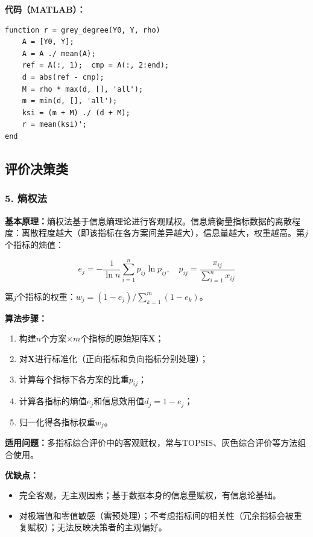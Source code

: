 \documentclass[12pt,a4paper]{ctexart}
\begin{document}
\textbf{代码（MATLAB）：}
\begin{lstlisting}
function r = grey_degree(Y0, Y, rho)
    A = [Y0, Y];
    A = A ./ mean(A);
    ref = A(:, 1);  cmp = A(:, 2:end);
    d = abs(ref - cmp);
    M = rho * max(d, [], 'all');
    m = min(d, [], 'all');
    ksi = (m + M) ./ (d + M);
    r = mean(ksi)';
end
\end{lstlisting}

\subsection{评价决策类}

\subsubsection{5. 熵权法}

\textbf{基本原理：}熵权法基于信息熵理论进行客观赋权。信息熵衡量指标数据的离散程度：离散程度越大（即该指标在各方案间差异越大），信息量越大，权重越高。第$j$个指标的熵值：

\begin{equation}
e_j = -\frac{1}{\ln n} \sum_{i=1}^n p_{ij} \ln p_{ij}, \quad
p_{ij} = \frac{x_{ij}}{\sum_{i=1}^n x_{ij}}
\end{equation}

第$j$个指标的权重：$w_j = (1 - e_j) / \sum_{k=1}^m (1 - e_k)$。

\textbf{算法步骤：}
\begin{enumerate}[label=(\arabic*), leftmargin=*]
    \item 构建$n$个方案$\times m$个指标的原始矩阵$\mathbf{X}$；
    \item 对$\mathbf{X}$进行标准化（正向指标和负向指标分别处理）；
    \item 计算每个指标下各方案的比重$p_{ij}$；
    \item 计算各指标的熵值$e_j$和信息效用值$d_j = 1 - e_j$；
    \item 归一化得各指标权重$w_j$。
\end{enumerate}

\textbf{适用问题：}多指标综合评价中的客观赋权，常与TOPSIS、灰色综合评价等方法组合使用。

\textbf{优缺点：}
\begin{itemize}[leftmargin=*]
    \item[+] 完全客观，无主观因素；基于数据本身的信息量赋权，有信息论基础。
    \item[$-$] 对极端值和零值敏感（需预处理）；不考虑指标间的相关性（冗余指标会被重复赋权）；无法反映决策者的主观偏好。
\end{itemize}
\end{document}

